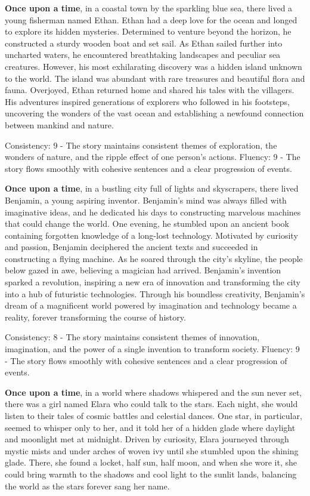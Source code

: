 \documentclass{article}
\begin{document}
\textbf{Once upon a time}, in a coastal town by the sparkling blue sea, there lived a young fisherman named Ethan. Ethan had a deep love for the ocean and longed to explore its hidden mysteries. Determined to venture beyond the horizon, he constructed a sturdy wooden boat and set sail. As Ethan sailed further into uncharted waters, he encountered breathtaking landscapes and peculiar sea creatures. However, his most exhilarating discovery was a hidden island unknown to the world. The island was abundant with rare treasures and beautiful flora and fauna. Overjoyed, Ethan returned home and shared his tales with the villagers. His adventures inspired generations of explorers who followed in his footsteps, uncovering the wonders of the vast ocean and establishing a newfound connection between mankind and nature.

Consistency: 9 - The story maintains consistent themes of exploration, the wonders of nature, and the ripple effect of one person's actions.
Fluency: 9 - The story flows smoothly with cohesive sentences and a clear progression of events.

\textbf{Once upon a time}, in a bustling city full of lights and skyscrapers, there lived Benjamin, a young aspiring inventor. Benjamin's mind was always filled with imaginative ideas, and he dedicated his days to constructing marvelous machines that could change the world. One evening, he stumbled upon an ancient book containing forgotten knowledge of a long-lost technology. Motivated by curiosity and passion, Benjamin deciphered the ancient texts and succeeded in constructing a flying machine. As he soared through the city's skyline, the people below gazed in awe, believing a magician had arrived. Benjamin's invention sparked a revolution, inspiring a new era of innovation and transforming the city into a hub of futuristic technologies. Through his boundless creativity, Benjamin's dream of a magnificent world powered by imagination and technology became a reality, forever transforming the course of history.

Consistency: 8 - The story maintains consistent themes of innovation, imagination, and the power of a single invention to transform society.
Fluency: 9 - The story flows smoothly with cohesive sentences and a clear progression of events.

\textbf{Once upon a time}, in a world where shadows whispered and the sun never set, there was a girl named Elara who could talk to the stars. Each night, she would listen to their tales of cosmic battles and celestial dances. One star, in particular, seemed to whisper only to her, and it told her of a hidden glade where daylight and moonlight met at midnight. Driven by curiosity, Elara journeyed through mystic mists and under arches of woven ivy until she stumbled upon the shining glade. There, she found a locket, half sun, half moon, and when she wore it, she could bring warmth to the shadows and cool light to the sunlit lands, balancing the world as the stars forever sang her name.
\end{document}
